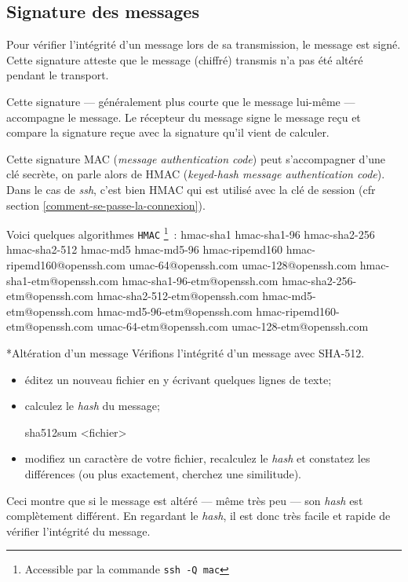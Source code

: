 \documentclass[a4paper,11pt]{article}
\begin{document}
\subsection{Signature des messages}
\label{signature}

Pour vérifier l'intégrité d'un message lors de sa transmission, le message est
signé. Cette signature atteste que le message (chiffré) transmis n'a pas été
altéré pendant le transport. 

Cette signature — généralement plus courte que le message lui-même — accompagne
le message. Le récepteur du message signe le message reçu et compare la
signature reçue avec la signature qu'il vient de calculer. 

Cette signature MAC (\textit{message authentication code}) peut s'accompagner
d'une clé secrète, on parle alors de HMAC (\textit{keyed-hash message
authentication code}). Dans le cas de \textit{ssh}, c'est bien HMAC qui est
utilisé avec la clé de session (cfr section \ref{comment-se-passe-la-connexion}). 

Voici quelques algorithmes \texttt{HMAC}
\footnote{Accessible par la commande \texttt{ssh -Q mac}}~:
hmac-sha1 hmac-sha1-96 hmac-sha2-256 hmac-sha2-512 hmac-md5 hmac-md5-96
hmac-ripemd160 hmac-ripemd160@openssh.com umac-64\-@openssh.com
umac-128@openssh.com hmac-sha1-etm@openssh.com hmac-sha1-96-etm\-@openssh.com
hmac-sha2-256-etm@openssh.com hmac-sha2-512-etm@openssh.com
h\-mac-md5-etm@openssh.com hmac-md5-96-etm@openssh.com
hmac-ripemd160-etm\-@o\-penssh.com umac-64-etm@openssh.com umac-128-etm@openssh.com

\bigskip
\begin{Exercice}*{Altération d'un message}
	Vérifions l'intégrité d'un message avec SHA-512. 

	\begin{itemize}
	
		\item éditez un nouveau fichier en y écrivant quelques lignes de texte;
		\item calculez le \textit{hash} du message; 

			\begin{term}
				sha512sum <fichier>
			\end{term}

		\item modifiez un caractère de votre fichier, recalculez le
			\textit{hash} et constatez les différences (ou plus exactement,
			cherchez une similitude).
	\end{itemize}

	Ceci montre que si le message est altéré — même très peu — son \textit{hash}
	est complètement différent. En regardant le \textit{hash}, il est donc très
	facile et rapide de vérifier l'intégrité du message. 

\end{Exercice}
\end{document}
